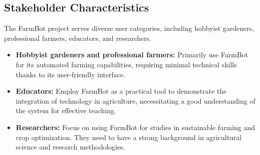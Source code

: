 \subsection{Stakeholder Characteristics}
The FarmBot project serves diverse user categories, including hobbyist gardeners, professional farmers, educators, and researchers.
\begin{itemize}
    \item \textbf{Hobbyist gardeners and professional farmers:} Primarily use FarmBot for its automated farming capabilities, requiring minimal technical skills thanks to its user-friendly interface.
    \item \textbf{Educators:} Employ FarmBot as a practical tool to demonstrate the integration of technology in agriculture, necessitating a good understanding of the system for effective teaching.
    \item \textbf{Researchers:} Focus on using FarmBot for studies in sustainable farming and crop optimization. They need to have a strong background in agricultural science and research methodologies.
\end{itemize}


